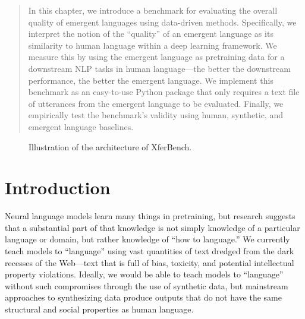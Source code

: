 \begin{abstract}
In this chapter, we introduce a benchmark for evaluating the overall quality of emergent languages using data-driven methods.
Specifically, we interpret the notion of the ``quality'' of an emergent language as its similarity to human language within a deep learning framework.
We measure this by using the emergent language as pretraining data for a downstream NLP tasks in human language---the better the downstream performance, the better the emergent language.
We implement this benchmark as an easy-to-use Python package that only requires a text file of utterances from the emergent language to be evaluated.
Finally, we empirically test the benchmark's validity using human, synthetic, and emergent language baselines.
\end{abstract}

\begin{figure*}
  \centering
  \caption{Illustration of the architecture of XferBench.}
  \unskip\label{fig:chart}
\end{figure*}

\section{Introduction}


Neural language models learn many things in pretraining, but research suggests \citep{artetxe-etal-2020-cross} that a substantial part of that knowledge is not simply knowledge of a particular language or domain, but rather knowledge of ``how to language.''
We currently teach models to ``language'' using vast quantities of text dredged from the dark recesses of the Web---text that is full of bias, toxicity, and potential intellectual property violations.
Ideally, we would be able to teach models to ``language'' without such compromises through the use of synthetic data, but mainstream approaches to synthesizing data produce outputs that do not have the same structural and social properties as human language.

